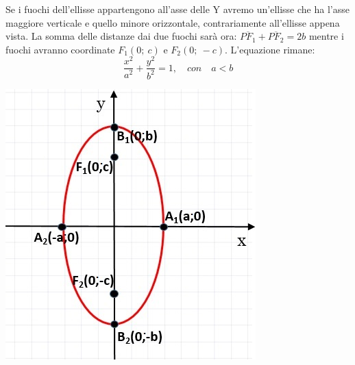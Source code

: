 \noindent \begin{minipage}{.75\textwidth}
   Se i fuochi dell'ellisse appartengono all'asse delle Y avremo 
un'ellisse che ha l'asse maggiore verticale e quello minore orizzontale,
contrariamente all'ellisse appena vista. La somma delle 
distanze dai due fuochi sarà ora: \(\overline{PF_{1}}+\overline{PF_{2}}=2b\) 
mentre i fuochi avranno coordinate \( F_{1} (0;~c)\) e \( F_{2} (0;~-c)\). 
L'equazione rimane:
  \begin{equation}
  \dfrac{x^{2}}{a^{2}}+\dfrac{y^{2}}{b^{2}}=1, \quad con  \quad a<b
  \end{equation}
  
\end{minipage}
 \hspace{0.5cm}
 \begin{minipage}{.2\textwidth}
   \includegraphics[width=\textwidth]{img/ellisseassey.jpg}
\end{minipage}

